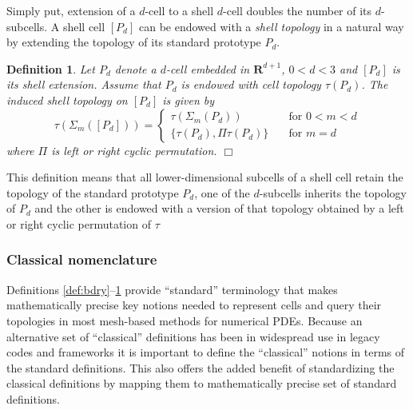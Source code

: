 \documentclass[pdf,12pt,relaxed]{SANDreport}
\newtheorem{defin}{Definition}
\begin{document}
   Simply put, extension of a $d$-cell to a shell $d$-cell doubles the number of its $d$-subcells. A shell cell $[P_d]$ can be endowed with a  \emph{shell topology} in a natural way by extending the topology of its standard prototype $P_d$.
    
    
    \begin{defin}\label{def:shell-topo}
    Let $P_d$ denote a $d$-cell embedded in $\mathbf{R}^{d+1}$, $0<d<3$ and $[P_d]$ is its shell extension. Assume that $P_d$ is endowed with cell topology $\tau(P_d)$. The induced shell topology on $[P_d]$ is given by
        $$
    \tau(\Sigma_m([P_d])) = 
    \left\{
    \begin{array}{rl}  
    \displaystyle \tau(\Sigma_m(P_d)) & \quad\mbox{for $0<m<d$} \\[1ex]
    \displaystyle \{\tau(P_d), \Pi\tau(P_d)\}       & \quad\mbox{for $m=d$}
    \end{array}\right.
    $$
    where $\Pi$ is left or right cyclic permutation.
    \hfill $\Box$
    \end{defin} 
    
    
    This definition means that all lower-dimensional subcells of a shell cell retain the topology of the standard prototype $P_d$, one of the $d$-subcells inherits the topology of $P_d$ and the other is endowed with a version of that topology obtained by a left or right cyclic permutation of $\tau$
    
    
    \subsubsection{Classical nomenclature}
    
           Definitions  \ref{def:bdry}--\ref{def:shell-topo} provide  ``standard'' terminology that 
makes mathematically precise key notions needed to represent cells and query their topologies in most mesh-based methods for numerical PDEs. Because an alternative set of  ``classical'' definitions has been in widespread use in legacy codes and frameworks it is important to define the ``classical'' notions  in terms of the standard definitions. This also offers the added benefit of standardizing the classical definitions by mapping them to mathematically precise set of standard definitions. 
\end{document}
